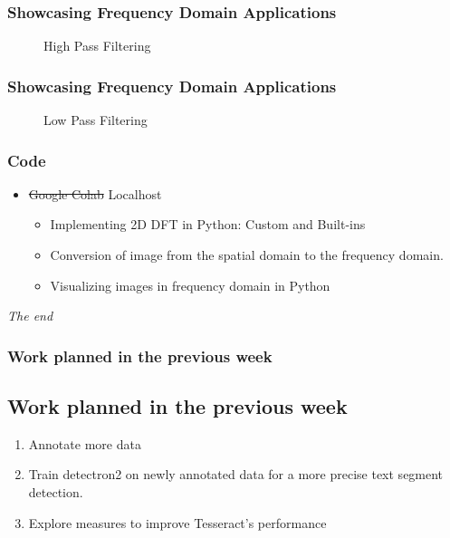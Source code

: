 \documentclass[compress]{beamer}
\begin{document}
  \begin{frame}
    \frametitle{Showcasing Frequency Domain Applications}

    \begin{figure}[H]
      \centering
      \caption{High Pass Filtering}
    \end{figure}
    
  \end{frame}

  \begin{frame}
    \frametitle{Showcasing Frequency Domain Applications}

    \begin{figure}[H]
      \centering
      \caption{Low Pass Filtering}
    \end{figure}
    
  \end{frame}
  \begin{frame}
    \frametitle{Code}

    \vskip -60pt
    
    \begin{itemize}
      \item \sout{Google Colab} Localhost
        \begin{itemize}
          \item Implementing 2D DFT in Python: Custom and Built-ins
          \item Conversion of image from the spatial domain to the frequency domain.
          \item Visualizing images in frequency domain in Python
        \end{itemize}
    \end{itemize}
  \end{frame}


  \begin{frame}[noframenumbering]
    \vspace{10pt}
    \begin{center}
      \Huge \textit{The end}
    \end{center}
  \end{frame}
\endgroup

\fi

\begin{frame}
    \frametitle{Work planned in the previous week}
    \subsection{Work planned in the previous week}

    \begin{enumerate}
        \item Annotate more data
        \item Train detectron2 on newly annotated data for a more precise text
            segment detection.
        \item Explore measures to improve Tesseract's performance
    \end{enumerate}
    \vfill
\end{frame}
\end{document}

